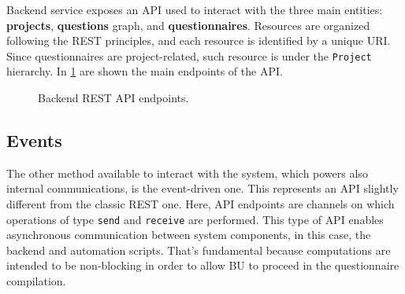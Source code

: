 \documentclass[12pt,a4paper,openright,twoside]{book}
\begin{document}
Backend service exposes an \ac{API} used to interact with the three main entities: \textbf{projects}, \textbf{questions} graph, and \textbf{questionnaires}.
%
Resources are organized following the REST principles, and each resource is identified by a unique URI.
%
Since questionnaires are project-related, such resource is under the \texttt{Project} hierarchy.
%
In \cref{fig:rest-api} are shown the main endpoints of the \ac{API}.


\begin{figure}
    \centering
    \hfill
    \hfill
    
    \caption{Backend REST \ac{API} endpoints.}
    \label{fig:rest-api}
\end{figure}


\subsection{Events}

The other method available to interact with the system, which powers also internal communications, is the event-driven one.
%
This represents an \ac{API} slightly different from the classic REST one. 
%
Here, \ac{API} endpoints are channels on which operations of type \texttt{send} and \texttt{receive} are performed.
%
This type of \ac{API} enables asynchronous communication between system components, in this case, the backend and automation scripts.
%
That's fundamental because computations are intended to be non-blocking in order to allow \ac{BU} to proceed in the questionnaire compilation.
\end{document}
